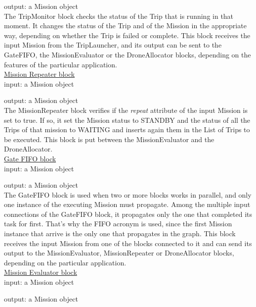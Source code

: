 output: a Mission object
\\

The TripMonitor block checks the status of the Trip that is running in that moment.
It changes the status of the Trip and of the Mission in the appropriate way, depending on whether the Trip is failed or complete.
This block receives the input Mission from the TripLauncher, and its output can be sent to the GateFIFO, the MissionEvaluator or the DroneAllocator blocks, depending on the features of the particular application.
\\



\underline{Mission Repeater block}
\\

input: a Mission object

output: a Mission object
\\

The MissionRepeater block verifies if the \textit{repeat} attribute of the input Mission is set to true.
If so, it set the Mission status to STANDBY and the status of all the Trips of that mission to WAITING and inserts again them in the List of Trips to be executed.
This block is put between the MissionEvaluator and the DroneAllocator.
\\

\underline{Gate FIFO block}
\\

input: a Mission object

output: a Mission object
\\

The GateFIFO block is used when two or more blocks works in parallel, and only one instance of the executing Mission must propagate.
Among the multiple input connections of the GateFIFO block, it propagates only the one that completed its task for first.
That's why the FIFO acronym is used, since the first Mission instance that arrive is the only one that propagates in the graph.
This block receives the input Mission from one of the blocks connected to it and can send its output to the MissionEvaluator, MissionRepeater or DroneAllocator blocks, depending on the particular application.
\\

\underline{Mission Evaluator block}
\\

input: a Mission object

output: a Mission object
\\

